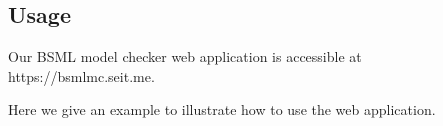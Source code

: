 \subsection{Usage}
Our BSML model checker web application is accessible at https://bsmlmc.seit.me.

Here we give an example to illustrate how to use the web application.